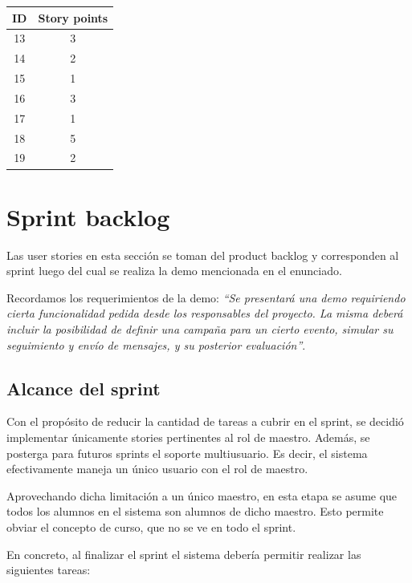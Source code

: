 \documentclass[a4paper, 10pt, twoside]{article}
\begin{document}
\begin{center}
\begin{tabular}{|c|c|}
\hline
ID & Story points\\
\hline
13 & 3\\
14 & 2\\
15 & 1\\
16 & 3\\
17 & 1\\
18 & 5\\
19 & 2\\
\hline
\end{tabular}
\end{center}




\newpage
\section{Sprint backlog}

Las user stories en esta sección se toman del product backlog y corresponden al sprint luego del cual se realiza la demo mencionada en el enunciado.

Recordamos los requerimientos de la demo: \emph{``Se presentará una demo requiriendo cierta funcionalidad pedida desde los responsables del proyecto. La misma deberá incluir la posibilidad de definir una campaña para un cierto evento, simular su seguimiento y envío de mensajes, y su posterior evaluación''}.


\subsection{Alcance del sprint}

Con el propósito de reducir la cantidad de tareas a cubrir en el sprint, se decidió implementar únicamente stories pertinentes al rol de maestro. Además, se posterga para futuros sprints el soporte multiusuario. Es decir, el sistema efectivamente maneja un único usuario con el rol de maestro.

Aprovechando dicha limitación a un único maestro, en esta etapa se asume que todos los alumnos en el sistema son alumnos de dicho maestro. Esto permite obviar el concepto de curso, que no se ve en todo el sprint.

En concreto, al finalizar el sprint el sistema debería permitir realizar las siguientes tareas:
\end{document}
